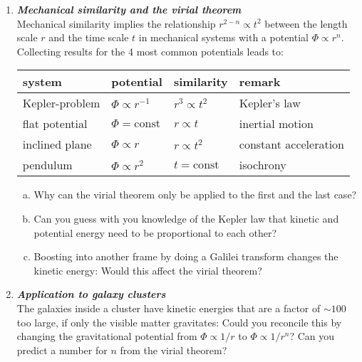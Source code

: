 \documentclass[a4paper,12pt]{article}
\newcommand{\question}[1]{\textbf{\textit{#1}}}
\begin{document}
\begin{enumerate}
\item \question{Mechanical similarity and the virial theorem}\\
Mechanical similarity implies the relationship $r^{2-n}\propto t^2$ between the length scale $r$ and the time scale $t$ in mechanical systems with a potential $\Phi\propto r^n$. Collecting results for the 4 most common potentials leads to:

\begin{table}[h]
\begin{center}
\begin{tabular}{|l|lll|}
\hline
system & potential & similarity & remark\\
\hline
Kepler-problem & $\Phi\propto r^{-1}$ & $r^3\propto t^2$ & Kepler's law\\
flat potential & $\Phi=\mathrm{const}$ & $r\propto t$ & inertial motion\\
inclined plane & $\Phi\propto r$ & $r\propto t^2$ & constant acceleration\\
pendulum & $\Phi\propto r^2$ & $t = \mathrm{const}$ & isochrony\\
\hline
\end{tabular}
\end{center}
\end{table}

\begin{enumerate}[(a)]
\item{Why can the virial theorem only be applied to the first and the last case?}
\item{Can you guess with you knowledge of the Kepler law that kinetic and potential energy need to be proportional to each other?}
\item{Boosting into another frame by doing a Galilei transform changes the kinetic energy: Would this affect the virial theorem?}
\end{enumerate}


\item \question{Application to galaxy clusters}\\
The galaxies inside a cluster have kinetic energies that are a factor of $\sim100$ too large, if only the visible matter gravitates: Could you reconcile this by changing the gravitational potential from $\Phi\propto 1/r$ to $\Phi\propto 1/r^n$? Can you predict a number for $n$ from the virial theorem?


\end{enumerate}
\end{document}

